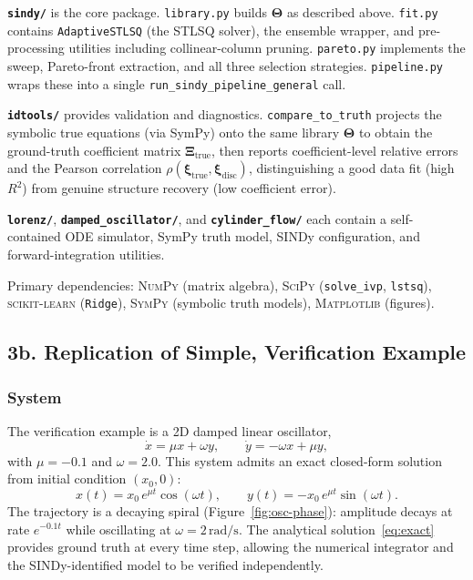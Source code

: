 \documentclass[12pt]{article}
\begin{document}
\textbf{\texttt{sindy/}} is the core package.  \texttt{library.py} builds
$\boldsymbol{\Theta}$ as described above.  \texttt{fit.py} contains
\texttt{AdaptiveSTLSQ} (the STLSQ solver), the ensemble wrapper, and
pre-processing utilities including collinear-column pruning.
\texttt{pareto.py} implements the sweep, Pareto-front extraction, and all
three selection strategies.  \texttt{pipeline.py} wraps these into a single
\texttt{run\_sindy\_pipeline\_general} call.

\textbf{\texttt{idtools/}} provides validation and diagnostics.
\texttt{compare\_to\_truth} projects the symbolic true equations (via SymPy)
onto the same library $\boldsymbol{\Theta}$ to obtain the ground-truth
coefficient matrix $\boldsymbol{\Xi}_{\mathrm{true}}$, then reports
coefficient-level relative errors and the Pearson correlation
$\rho(\boldsymbol{\xi}_{\mathrm{true}}, \boldsymbol{\xi}_{\mathrm{disc}})$,
distinguishing a good data fit (high $R^{2}$) from genuine structure
recovery (low coefficient error).

\textbf{\texttt{lorenz/}}, \textbf{\texttt{damped\_oscillator/}}, and
\textbf{\texttt{cylinder\_flow/}} each contain a self-contained ODE simulator,
SymPy truth model, SINDy configuration, and forward-integration utilities.

Primary dependencies: \textsc{NumPy} (matrix algebra),
\textsc{SciPy} (\texttt{solve\_ivp}, \texttt{lstsq}),
\textsc{scikit-learn} (\texttt{Ridge}),
\textsc{SymPy} (symbolic truth models),
\textsc{Matplotlib} (figures).

\subsection*{3b. Replication of Simple, Verification Example}

\subsubsection*{System}

The verification example is a 2D damped linear oscillator,
\begin{equation}
  \dot{x} = \mu x + \omega y, \qquad \dot{y} = -\omega x + \mu y,
  \label{eq:oscillator}
\end{equation}
with $\mu = -0.1$ and $\omega = 2.0$.  This system admits an exact closed-form
solution from initial condition $(x_{0}, 0)$:
\begin{equation}
  x(t) = x_{0}\,e^{\mu t}\cos(\omega t), \qquad
  y(t) = -x_{0}\,e^{\mu t}\sin(\omega t).
  \label{eq:exact}
\end{equation}
The trajectory is a decaying spiral (Figure~\ref{fig:osc-phase}): amplitude
decays at rate $e^{-0.1t}$ while oscillating at $\omega = 2\,\mathrm{rad/s}$.
The analytical solution~\eqref{eq:exact} provides ground truth at every time
step, allowing the numerical integrator and the SINDy-identified model to be
verified independently.
\end{document}
